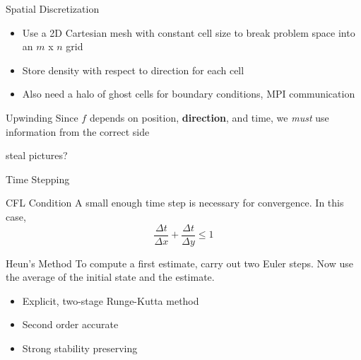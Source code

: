 \documentclass{beamer}
\begin{document}
    \begin{frame}{Spatial Discretization}
        \begin{itemize}
            \item Use a 2D Cartesian mesh with constant cell size to break problem space into an $m$ x $n$ grid
            \item Store density with respect to direction for each cell
            \item Also need a halo of ghost cells for boundary conditions, MPI communication
        \end{itemize}

        \vfill

        \begin{block}{Upwinding}
            Since $f$ depends on position, \textbf{direction}, and time, we \emph{must} use information from the correct side

            \alert{steal pictures?}
        \end{block}
    \end{frame}

    \begin{frame}{Time Stepping}
        \begin{block}{CFL Condition}
            A small enough time step is necessary for convergence. In this case,
            \begin{equation*}
                \frac{\Delta t}{\Delta x} + \frac{\Delta t}{\Delta y} \leq 1
            \end{equation*}
        \end{block}

        \vfill

        \begin{block}{Heun's Method}
            To compute a first estimate, carry out two Euler steps.
            Now use the average of the initial state and the estimate.
            \begin{itemize}
                \item Explicit, two-stage Runge-Kutta method
                \item Second order accurate
                \item Strong stability preserving
            \end{itemize}
        \end{block}
    \end{frame}
\end{document}
